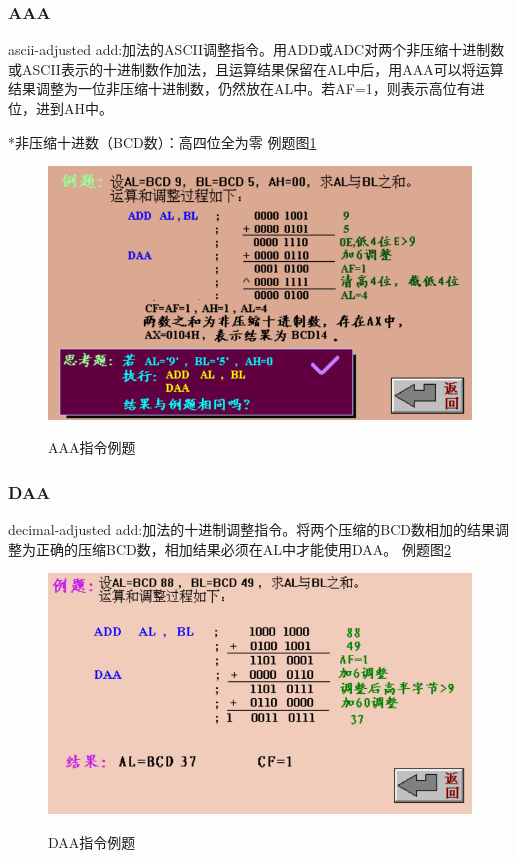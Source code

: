 \subsubsection{AAA}
ascii-adjusted add:加法的ASCII调整指令。用ADD或ADC对两个非压缩十进制数或ASCII表示的十进制数作加法，且运算结果保留在AL中后，用AAA可以将运算结果调整为一位非压缩十进制数，仍然放在AL中。若AF=1，则表示高位有进位，进到AH中。

*非压缩十进数（BCD数）：高四位全为零
例题图\ref{AAA指令例题}
\begin{figure}[H]
    \centering 
    \includegraphics[scale=1]{part_指令系统/part_指令系统_pic/AAA指令例题.png}
    \label{AAA指令例题}
    \caption{AAA指令例题}
\end{figure}
\subsubsection{DAA}
decimal-adjusted add:加法的十进制调整指令。将两个压缩的BCD数相加的结果调整为正确的压缩BCD数，相加结果必须在AL中才能使用DAA。
例题图\ref{DAA指令例题}
\begin{figure}[H]
    \centering 
    \includegraphics[scale=1]{part_指令系统/part_指令系统_pic/DAA指令例题.png}
    \label{DAA指令例题}
    \caption{DAA指令例题}
\end{figure}

